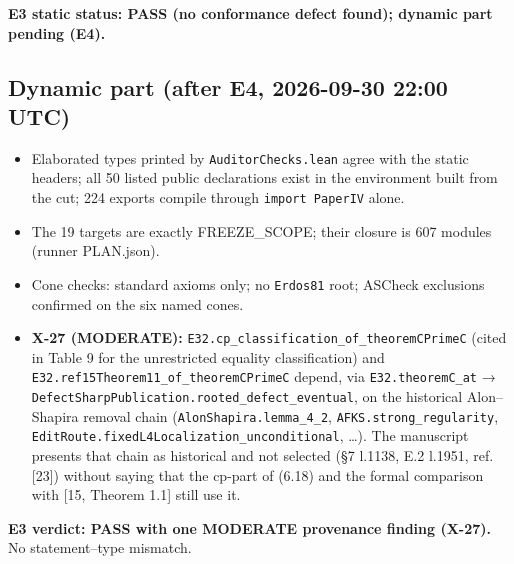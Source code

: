 \documentclass[
]{article}
\providecommand{\tightlist}{%
  \setlength{\itemsep}{0pt}\setlength{\parskip}{0pt}}
\begin{document}
\textbf{E3 static status: PASS (no conformance defect found); dynamic
part pending (E4).}

\subsection{Dynamic part (after E4, 2026-09-30 22:00
UTC)}\label{dynamic-part-after-e4-2026-09-30-2200-utc}

\begin{itemize}
\tightlist
\item
  Elaborated types printed by \texttt{AuditorChecks.lean} agree with the
  static headers; all 50 listed public declarations exist in the
  environment built from the cut; 224 exports compile through
  \texttt{import\ PaperIV} alone.
\item
  The 19 targets are exactly FREEZE\_SCOPE; their closure is 607 modules
  (runner PLAN.json).
\item
  Cone checks: standard axioms only; no \texttt{Erdos81} root; ASCheck
  exclusions confirmed on the six named cones.
\item
  \textbf{X-27 (MODERATE):}
  \texttt{E32.cp\_classification\_of\_theoremCPrimeC} (cited in Table 9
  for the unrestricted equality classification) and
  \texttt{E32.ref15Theorem11\_of\_theoremCPrimeC} depend, via
  \texttt{E32.theoremC\_at} →
  \texttt{DefectSharpPublication.rooted\_defect\_eventual}, on the
  historical Alon--Shapira removal chain
  (\texttt{AlonShapira.lemma\_4\_2}, \texttt{AFKS.strong\_regularity},
  \texttt{EditRoute.fixedL4Localization\_unconditional}, \ldots). The
  manuscript presents that chain as historical and not selected (§7
  l.1138, E.2 l.1951, ref. {[}23{]}) without saying that the cp-part of
  (6.18) and the formal comparison with {[}15, Theorem 1.1{]} still use
  it.
\end{itemize}

\textbf{E3 verdict: PASS with one MODERATE provenance finding (X-27).}
No statement--type mismatch.
\end{document}
